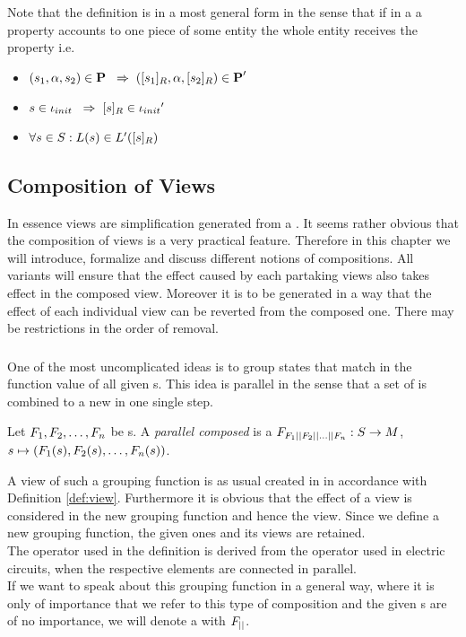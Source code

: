 \documentclass[preview]{standalone}
\begin{document}
Note that the definition is in a most general form in the sense that if in a \viewN a property accounts to one piece of some entity the whole entity receives the property i.e. 
\begin{itemize}	
	\item $({s}_1, {\alpha}, {s}_2) \in {\ensuremath{{\textbf{P}}}} {\hspace{3mm}\Rightarrow\hspace{2mm}} ({{[{s}_1]_{{R}}}}, {\alpha}, {{[{s}_2]_{{R}}}}) \in {\ensuremath{{\textbf{P}}}}'$
	\item ${s} \in {\ensuremath{{\iota_{init}}}} {\hspace{3mm}\Rightarrow\hspace{2mm}} {\ensuremath{{[{s}]_{{R}}}}} \in {\iota_{init}}'$
	\item $\forall {s} \in {S} : {L}({s}) \in {L}'({{[{s}]_{{R}}}})$
\end{itemize}

\subsection{Composition of Views}
In essence views are simplification generated from a \chosengraphtypeN. It seems rather obvious that the composition of views is a very practical feature. Therefore in this chapter we will introduce, formalize and discuss different notions of compositions. All variants will ensure that the effect caused by each partaking views also takes effect in the composed view. Moreover it is to be generated in a way that the effect of each individual view can be reverted from the composed one. There may be restrictions in the order of removal.

\subsubsection{\parllcompNCC}
One of the most uncomplicated ideas is to group states that match in the function value of all given \grpfctN s. This idea is parallel in the sense that a set of \grpfctN is combined to a new \grpfctN in one single step.
\begin{definition}
	Let ${F}_1, {F}_2, \dots, {F}_n$ be \grpfctN s. A \emph{parallel composed \grpfctN} is a \grpfctN ${F}_{{F}_1 {||} {F}_2 {||} \dots {||} {F}_n}: {S} \to {M}$, ${s} \mapsto ({F}_1({s}), {F}_2({s}), \dots, {F}_n({s}))$.
		
\end{definition}

A view of such a grouping function is as usual created in in accordance with Definition \ref{def:view}. Furthermore it is obvious that the effect of a view is considered in the new grouping function and hence the view.
Since we define a new grouping function, the given ones and its views are retained. \\
The operator \pll used in the definition is derived from the operator used in electric circuits, when the respective elements are connected in parallel. \\
If we want to speak about this grouping function in a general way, where it is only of importance that we refer to this type of composition and the given \grpfctN s are of no importance, we will denote a \emph{\parllcompN \grpfctN} with ${F}_{{||}}$. \\
\end{document}
